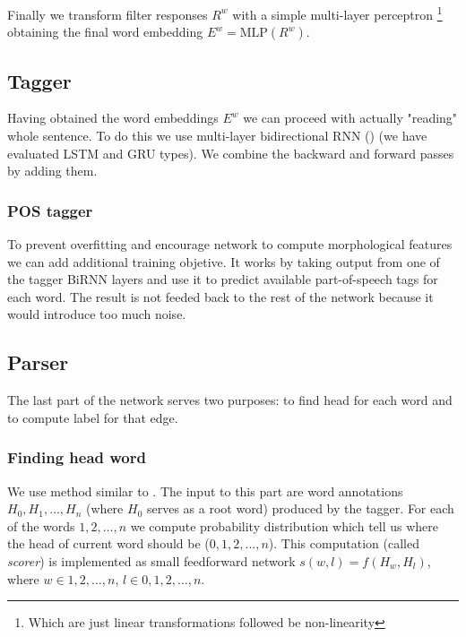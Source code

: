 Finally we transform filter responses $R^w$ with a simple multi-layer perceptron
\footnote{Which are just linear transformations followed be non-linearity}
obtaining the final word embedding $E^w = \text{MLP}(R^w)$.

\subsection{Tagger}
Having obtained the word embeddings $E^w$ we can proceed with actually "reading"
whole sentence. To do this we use multi-layer bidirectional RNN (\cite{schuster_bidirectional_1997})
(we have evaluated LSTM\cite{RNN_LSTM} and GRU\cite{RNN_GRU} types). We combine
the backward and forward passes by adding them.

\subsubsection{POS tagger}
To prevent overfitting and encourage network to compute morphological features
we can add additional training objetive. It works by taking output from one of
the tagger BiRNN layers and use it to predict available part-of-speech tags for
each word. The result is not feeded back to the rest of the network because it
would introduce too much noise.

\subsection{Parser}
The last part of the network serves two purposes: to find head for each word and
to compute label for that edge.

\subsubsection{Finding head word}
We use method similar to \cite{vinyals_pointer_2015}.
The input to this part are word annotations $H_0, H_1, \dots, H_n$ (where $H_0$
serves as a root word) produced by the tagger. For each of the words $1,2,\dots,n$
we compute probability distribution which tell us where the head of current
word should be ($0,1,2,\dots,n$). This computation (called \textit{scorer}) is implemented
as small feedforward network $s(w,l) = f(H_w, H_l)$, where $w \in {1,2,\dots,n}$,
$l \in {0,1,2,\dots,n}$.

